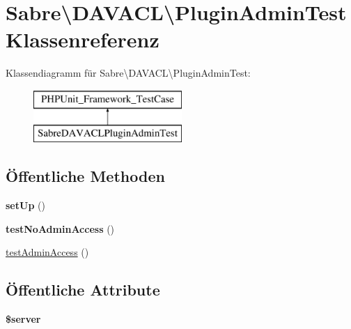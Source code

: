 \hypertarget{class_sabre_1_1_d_a_v_a_c_l_1_1_plugin_admin_test}{}\section{Sabre\textbackslash{}D\+A\+V\+A\+CL\textbackslash{}Plugin\+Admin\+Test Klassenreferenz}
\label{class_sabre_1_1_d_a_v_a_c_l_1_1_plugin_admin_test}
Klassendiagramm für Sabre\textbackslash{}D\+A\+V\+A\+CL\textbackslash{}Plugin\+Admin\+Test\+:\begin{figure}[H]
\begin{center}
\leavevmode
\includegraphics[height=2.000000cm]{class_sabre_1_1_d_a_v_a_c_l_1_1_plugin_admin_test}
\end{center}
\end{figure}
\subsection*{Öffentliche Methoden}
\begin{DoxyCompactItemize}
\item 
\mbox{\label{class_sabre_1_1_d_a_v_a_c_l_1_1_plugin_admin_test_a8728e5d4db2e7150fe0fcb2b6b95384d}} 
{\bfseries set\+Up} ()
\item 
\mbox{\label{class_sabre_1_1_d_a_v_a_c_l_1_1_plugin_admin_test_a001e57f110b11f40cd391cf1e70351cb}} 
{\bfseries test\+No\+Admin\+Access} ()
\item 
\mbox{\hyperlink{class_sabre_1_1_d_a_v_a_c_l_1_1_plugin_admin_test_ab8462f349aa54c62fcda1d3ac1c19581}{test\+Admin\+Access}} ()
\end{DoxyCompactItemize}
\subsection*{Öffentliche Attribute}
\begin{DoxyCompactItemize}
\item 
\mbox{\label{class_sabre_1_1_d_a_v_a_c_l_1_1_plugin_admin_test_ae532114727f7f1cf3396557edda4f5a5}} 
{\bfseries \$server}
\end{DoxyCompactItemize}



